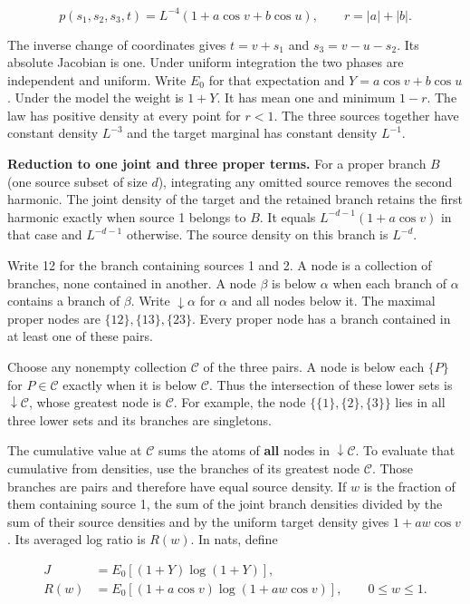 \[
p(s_1,s_2,s_3,t)=L^{-4}(1+a\cos v+b\cos u),\qquad r=|a|+|b|.
\]

The inverse change of coordinates gives \(t=v+s_1\) and \(s_3=v-u-s_2\). Its absolute Jacobian is one. Under uniform integration the two phases are independent and uniform. Write \(E_0\) for that expectation and \(Y=a\cos v+b\cos u\). Under the model the weight is \(1+Y\). It has mean one and minimum \(1-r\). The law has positive density at every point for \(r<1\). The three sources together have constant density \(L^{-3}\) and the target marginal has constant density \(L^{-1}\).

\textbf{Reduction to one joint and three proper terms.} For a proper branch \(B\) (one source subset of size \(d\)), integrating any omitted source removes the second harmonic. The joint density of the target and the retained branch retains the first harmonic exactly when source 1 belongs to \(B\). It equals \(L^{-d-1}(1+a\cos v)\) in that case and \(L^{-d-1}\) otherwise. The source density on this branch is \(L^{-d}\).

Write 12 for the branch containing sources 1 and 2. A node is a collection of branches, none contained in another. A node \(\beta\) is below \(\alpha\) when each branch of \(\alpha\) contains a branch of \(\beta\). Write \(\downarrow\alpha\) for \(\alpha\) and all nodes below it. The maximal proper nodes are \(\{12\},\{13\},\{23\}\). Every proper node has a branch contained in at least one of these pairs.

Choose any nonempty collection \(\mathcal C\) of the three pairs. A node is below each \(\{P\}\) for \(P\in\mathcal C\) exactly when it is below \(\mathcal C\). Thus the intersection of these lower sets is \(\downarrow\mathcal C\), whose greatest node is \(\mathcal C\). For example, the node \(\{\{1\},\{2\},\{3\}\}\) lies in all three lower sets and its branches are singletons.

The cumulative value at \(\mathcal C\) sums the atoms of \textbf{all} nodes in \(\downarrow\mathcal C\). To evaluate that cumulative from densities, use the branches of its greatest node \(\mathcal C\). Those branches are pairs and therefore have equal source density. If \(w\) is the fraction of them containing source 1, the sum of the joint branch densities divided by the sum of their source densities and by the uniform target density gives \(1+aw\cos v\). Its averaged log ratio is \(R(w)\). In nats, define

\[
\begin{aligned}
J&=E_0[(1+Y)\log(1+Y)],\\
R(w)&=E_0[(1+a\cos v)\log(1+aw\cos v)],\qquad 0\le w\le1 .
\end{aligned}
\]


